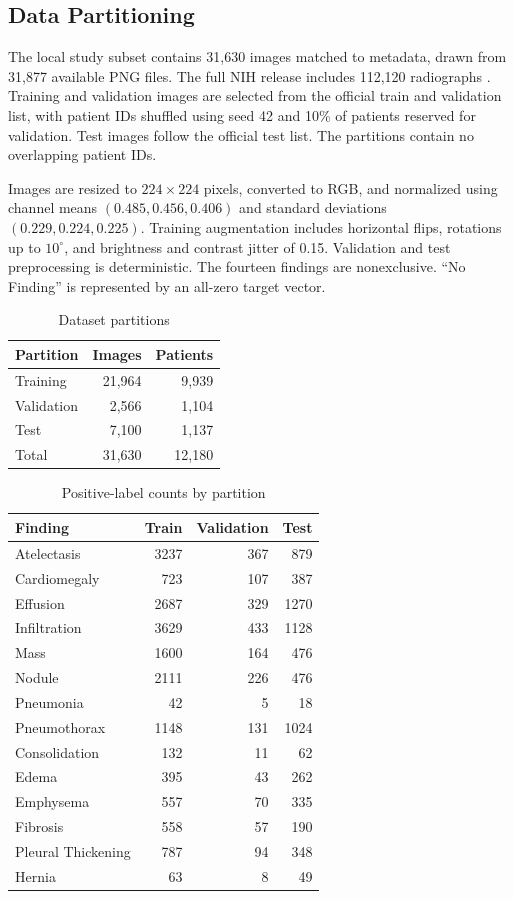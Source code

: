 \documentclass[conference,letterpaper]{IEEEtran}
\begin{document}
\subsection{Data Partitioning}

The local study subset contains 31,630 images matched to metadata, drawn from 31,877 available PNG files. The full NIH release includes 112,120 radiographs \cite{nihdataset}. Training and validation images are selected from the official train and validation list, with patient IDs shuffled using seed 42 and 10\% of patients reserved for validation. Test images follow the official test list. The partitions contain no overlapping patient IDs.

Images are resized to $224\times224$ pixels, converted to RGB, and normalized using channel means $(0.485,0.456,0.406)$ and standard deviations $(0.229,0.224,0.225)$. Training augmentation includes horizontal flips, rotations up to $10^\circ$, and brightness and contrast jitter of 0.15. Validation and test preprocessing is deterministic. The fourteen findings are nonexclusive. ``No Finding'' is represented by an all-zero target vector.

\begin{table}[t]
\caption{Dataset partitions}
\label{tab:split}
\centering\footnotesize
\begin{tabular}{lrr}
\toprule
Partition & Images & Patients\\
\midrule
Training & 21,964 & 9,939\\
Validation & 2,566 & 1,104\\
Test & 7,100 & 1,137\\
\midrule
Total & 31,630 & 12,180\\
\bottomrule
\end{tabular}
\end{table}

\begin{table}[t]
\caption{Positive-label counts by partition}
\label{tab:prevalence}
\centering\footnotesize
\begin{tabular}{lrrr}
\toprule
Finding & Train & Validation & Test\\
\midrule
Atelectasis & 3237 & 367 & 879\\
Cardiomegaly & 723 & 107 & 387\\
Effusion & 2687 & 329 & 1270\\
Infiltration & 3629 & 433 & 1128\\
Mass & 1600 & 164 & 476\\
Nodule & 2111 & 226 & 476\\
Pneumonia & 42 & 5 & 18\\
Pneumothorax & 1148 & 131 & 1024\\
Consolidation & 132 & 11 & 62\\
Edema & 395 & 43 & 262\\
Emphysema & 557 & 70 & 335\\
Fibrosis & 558 & 57 & 190\\
Pleural Thickening & 787 & 94 & 348\\
Hernia & 63 & 8 & 49\\
\bottomrule
\end{tabular}
\end{table}
\end{document}
